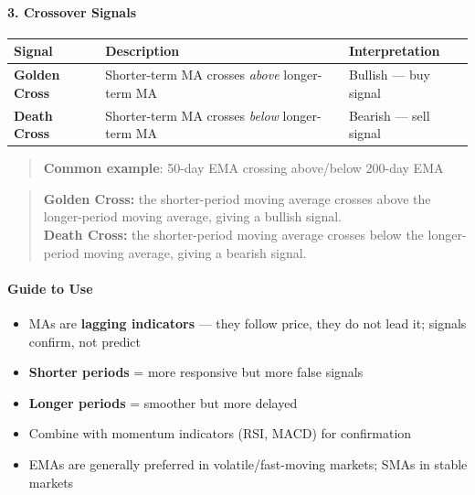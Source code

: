\documentclass[12pt,openany]{book}
\begin{document}
\paragraph{3. Crossover Signals}

\begin{center}
\small
\renewcommand{\arraystretch}{1.2}
\begin{tabular}{|L{0.25\textwidth}|L{0.34\textwidth}|L{0.31\textwidth}|}
\hline
 \textbf{Signal} & \textbf{Description} & \textbf{Interpretation} \\ \hline
 \textbf{Golden Cross} & Shorter-term MA crosses \emph{above} longer-term MA & Bullish --- buy signal \\ \hline
 \textbf{Death Cross} & Shorter-term MA crosses \emph{below} longer-term MA & Bearish --- sell signal \\ \hline
\end{tabular}
\end{center}

\begin{quote}
\textbf{Common example}: 50-day EMA crossing above/below 200-day EMA

\end{quote}
\begin{quote}
\textbf{Golden Cross:} the shorter-period moving average crosses above the longer-period moving average, giving a bullish signal.\\
\textbf{Death Cross:} the shorter-period moving average crosses below the longer-period moving average, giving a bearish signal.
\end{quote}

\paragraph{Guide to Use}
\begin{itemize}[leftmargin=*]
    \item MAs are \textbf{lagging indicators} --- they follow price, they do not lead it; signals confirm, not predict
    \item \textbf{Shorter periods} = more responsive but more false signals
    \item \textbf{Longer periods} = smoother but more delayed
    \item Combine with momentum indicators (RSI, MACD) for confirmation
    \item EMAs are generally preferred in volatile/fast-moving markets; SMAs in stable markets
\end{itemize}
\end{document}
